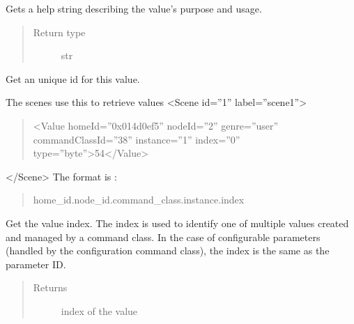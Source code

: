 \documentclass[letterpaper,10pt,english]{sphinxmanual}
\begin{document}
\begin{fulllineitems}
\begin{fulllineitems}
\label{value:openzwave.value.ZWaveValue.help}
Gets a help string describing the value's purpose and usage.
\begin{quote}\begin{description}
\item[{Return type}] \leavevmode
str

\end{description}\end{quote}

\end{fulllineitems}


\begin{fulllineitems}
\label{value:openzwave.value.ZWaveValue.id_on_network}
Get an unique id for this value.

The scenes use this to retrieve values
\textless{}Scene id=''1'' label=''scene1''\textgreater{}
\begin{quote}

\textless{}Value homeId=''0x014d0ef5'' nodeId=''2'' genre=''user'' commandClassId=''38'' instance=''1'' index=''0'' type=''byte''\textgreater{}54\textless{}/Value\textgreater{}
\end{quote}

\textless{}/Scene\textgreater{}
The format is :
\begin{quote}

home\_id.node\_id.command\_class.instance.index
\end{quote}

\end{fulllineitems}


\begin{fulllineitems}
\label{value:openzwave.value.ZWaveValue.index}
Get the value index.  The index is used to identify one of multiple
values created and managed by a command class.  In the case of configurable
parameters (handled by the configuration command class), the index is the
same as the parameter ID.
\begin{quote}\begin{description}
\item[{Returns}] \leavevmode
index of the value


\end{description}
\end{quote}
\end{fulllineitems}
\end{fulllineitems}
\end{document}
